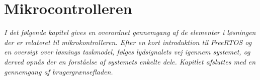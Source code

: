 \chapter{Mikrocontrolleren}\label{kap:mcu}
\vspace*{0.5 cm}
\emph{I det følgende kapitel gives en overordnet gennemgang af de elementer i løsningen der er relateret til mikrokontrolleren. Efter en kort introduktion til FreeRTOS og en oversigt over løsnings taskmodel, følges lydsignalets vej igennem systemet, og derved opnås der en forståelse af systemets enkelte dele. Kapitlet afsluttes med en gennemgang af brugergrænsefladen.}